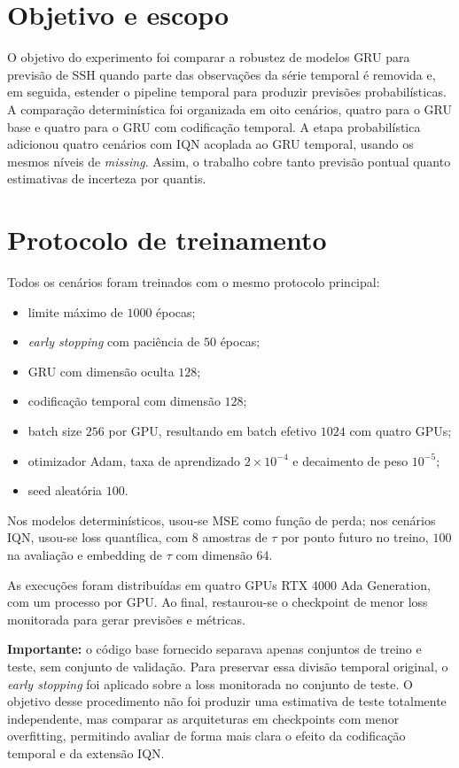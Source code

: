 \documentclass[a4paper,11pt]{article}
\begin{document}
\section{Objetivo e escopo}

O objetivo do experimento foi comparar a robustez de modelos GRU para previsão
de SSH quando parte das observações da série temporal é removida e, em seguida,
estender o pipeline temporal para produzir previsões probabilísticas. A
comparação determinística foi organizada em oito cenários, quatro para o GRU
base e quatro para o GRU com codificação temporal. A etapa probabilística
adicionou quatro cenários com IQN acoplada ao GRU temporal, usando os mesmos
níveis de \textit{missing}. Assim, o trabalho cobre tanto previsão pontual
quanto estimativas de incerteza por quantis.


\section{Protocolo de treinamento}

Todos os cenários foram treinados com o mesmo protocolo principal:
\begin{itemize}
\item limite máximo de $1000$ épocas;
\item \textit{early stopping} com paciência de $50$ épocas;
\item GRU com dimensão oculta $128$;
\item codificação temporal com dimensão $128$;
\item batch size $256$ por GPU, resultando em batch efetivo $1024$ com quatro GPUs;
\item otimizador Adam, taxa de aprendizado $2 \times 10^{-4}$ e decaimento de peso $10^{-5}$;
\item seed aleatória $100$.
\end{itemize}

Nos modelos determinísticos, usou-se MSE como função de perda; nos cenários IQN,
usou-se loss quantílica, com $8$ amostras de $\tau$ por ponto futuro no treino,
$100$ na avaliação e embedding de $\tau$ com dimensão $64$.

As execuções foram distribuídas em quatro GPUs RTX 4000 Ada Generation, com um
processo por GPU. Ao final, restaurou-se o checkpoint de menor loss monitorada
para gerar previsões e métricas. 

\textbf{Importante:} o código base fornecido separava apenas conjuntos de treino e teste,
sem conjunto de validação. Para preservar essa divisão temporal original, o
\textit{early stopping} foi aplicado sobre a loss monitorada no conjunto de
teste. O objetivo desse procedimento não foi produzir uma estimativa de teste
totalmente independente, mas comparar as arquiteturas em checkpoints com menor
overfitting, permitindo avaliar de forma mais clara o efeito da codificação
temporal e da extensão IQN.
\end{document}
